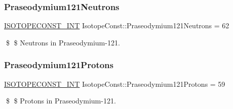 \subsubsection{\texorpdfstring{Praseodymium121\+Neutrons}{Praseodymium121Neutrons}}
{\footnotesize\ttfamily \mbox{\hyperlink{group___isotope_const-_macros_ga5f18360b3e99483a35c32d789e62621c}{I\+S\+O\+T\+O\+P\+E\+C\+O\+N\+S\+T\+\_\+\+I\+NT}} Isotope\+Const\+::\+Praseodymium121\+Neutrons = 62}

\$ \$ Neutrons in Praseodymium-\/121. \mbox{\label{group___isotope_const-_praseodymium-_pr121_ga9e69eae8da71e0cc10cd7c79dabdd51e}} 
\subsubsection{\texorpdfstring{Praseodymium121\+Protons}{Praseodymium121Protons}}
{\footnotesize\ttfamily \mbox{\hyperlink{group___isotope_const-_macros_ga5f18360b3e99483a35c32d789e62621c}{I\+S\+O\+T\+O\+P\+E\+C\+O\+N\+S\+T\+\_\+\+I\+NT}} Isotope\+Const\+::\+Praseodymium121\+Protons = 59}

\$ \$ Protons in Praseodymium-\/121. 